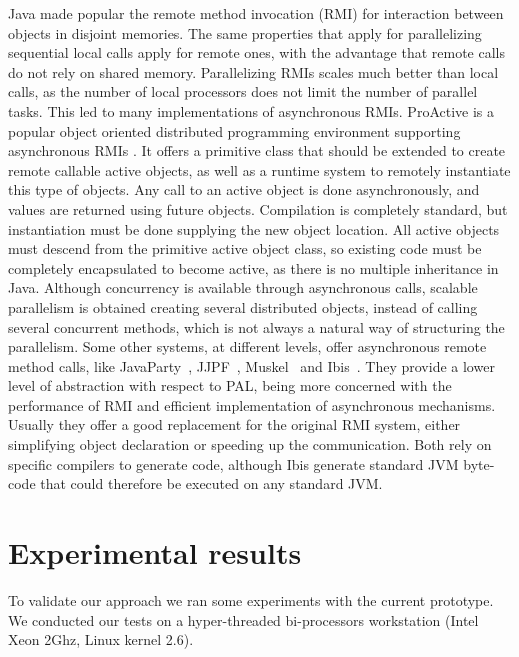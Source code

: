 \documentclass{acm_proc_article-sp}
\begin{document}
Java made popular the remote method invocation (RMI) for interaction between objects in disjoint memories. The same properties that apply for parallelizing sequential local calls apply for remote ones, with the advantage that remote calls do not rely on shared memory. Parallelizing RMIs scales much better than local calls, as the number of local processors does not limit the number of parallel tasks. This led to many implementations of asynchronous RMIs.
ProActive is a popular object oriented distributed programming environment supporting asynchronous RMIs \cite{proactive}. It offers a primitive class that should be extended to create remote callable active objects, as well as a runtime system to remotely instantiate this type of objects. Any call to an active object is done asynchronously, and values are returned using future objects. Compilation is completely standard, but instantiation must be done supplying the new object location. All active objects must descend from the primitive active object class, so existing code must be completely encapsulated to become active, as there is no multiple inheritance in Java. Although concurrency is available through asynchronous calls, scalable parallelism is obtained creating several distributed objects, instead of calling several concurrent methods, which is not always a natural way of structuring the parallelism.
Some other systems, at different levels, offer asynchronous remote method calls, like JavaParty~\cite{philippsen97javaparty}, JJPF~\cite{danelutto2005java}, Muskel~\cite{aldinucci2001muskel, danelutto2006joint, danelutto2006joint2} and Ibis\ \cite{Nieuwpoort2005a}. They provide a lower level of abstraction with respect to PAL,  being more concerned with the performance of RMI and efficient implementation of asynchronous mechanisms. Usually they offer a good replacement for the original RMI system, either simplifying object declaration or speeding up the communication. Both rely on specific compilers to generate code, although Ibis generate standard JVM byte-code that could therefore be executed on any standard JVM.

\section{Experimental results}
\label{sec:test} 

To validate our approach we ran some experiments with the current prototype. We conducted our tests on a hyper-threaded bi-processors workstation (Intel Xeon 2Ghz, Linux kernel 2.6). 
\end{document}
